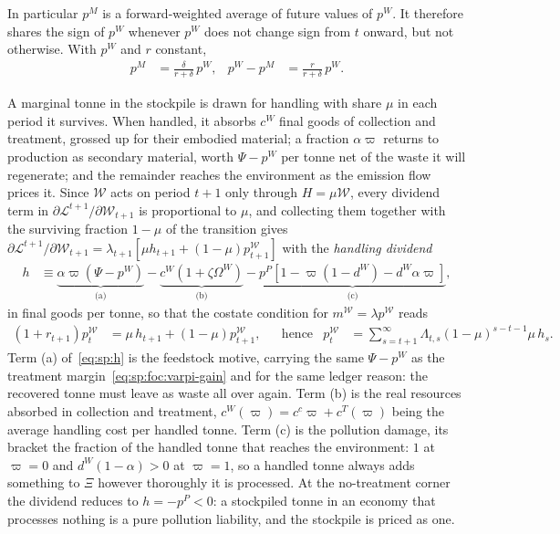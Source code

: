 In particular $p^M$ is a forward-weighted average of future values of $p^W$. It therefore shares the sign of $p^W$ whenever $p^W$ does not change sign from $t$ onward, but not otherwise. With $p^W$ and $r$ constant,
\begin{align}
p^M &= \frac{\delta}{r+\delta}\,p^W,
&
p^W-p^M &= \frac{r}{r+\delta}\,p^W .
\label{eq:sp:costate:M-steady}
\end{align}

 A marginal tonne in the stockpile is drawn for handling with share $\mu$ in each period it survives. When handled, it absorbs $c^W$ final goods of collection and treatment, grossed up for their embodied material; a fraction $\alpha\varpi$ returns to production as secondary material, worth $\Psi-p^W$ per tonne net of the waste it will regenerate; and the remainder reaches the environment as the emission flow prices it. Since $\mathcal W$ acts on period $t+1$ only through $H=\mu\mathcal W$, every dividend term in $\partial\mathcal L^{t+1}/\partial\mathcal W_{t+1}$ is proportional to $\mu$, and collecting them together with the surviving fraction $1-\mu$ of the transition gives $\partial\mathcal L^{t+1}/\partial\mathcal W_{t+1}=\lambda_{t+1}\left[\mu h_{t+1}+\left(1-\mu\right)p^{\mathcal W}_{t+1}\right]$ with the \emph{handling dividend}
\begin{align}
h &\equiv
\underbrace{\alpha\varpi\left(\Psi-p^W\right)}_{\text{(a)}}
-\underbrace{c^W\left(1+\zeta\Omega^W\right)}_{\text{(b)}}
-\underbrace{p^P\left[1-\varpi\left(1-d^W\right)-d^W\alpha\varpi\right]}_{\text{(c)}} ,
\label{eq:sp:h}
\end{align}
in final goods per tonne, so that the costate condition for $m^{\mathcal W}=\lambda p^{\mathcal W}$ reads
\begin{align}
\left(1+r_{t+1}\right)p^{\mathcal W}_t &= \mu\,h_{t+1}+\left(1-\mu\right)p^{\mathcal W}_{t+1},
&&\text{hence}
&
p^{\mathcal W}_t &= \sum_{s=t+1}^\infty \Lambda_{t,s}\left(1-\mu\right)^{s-t-1}\mu\,h_s .
\label{eq:sp:costate:Wstock}
\end{align}
Term (a) of~\eqref{eq:sp:h} is the feedstock motive, carrying the same $\Psi-p^W$ as the treatment margin~\eqref{eq:sp:foc:varpi-gain} and for the same ledger reason: the recovered tonne must leave as waste all over again. Term (b) is the real resources absorbed in collection and treatment, $c^W\left(\varpi\right)=c^c\varpi+c^T\left(\varpi\right)$ being the average handling cost per handled tonne. Term (c) is the pollution damage, its bracket the fraction of the handled tonne that reaches the environment: $1$ at $\varpi=0$ and $d^W\left(1-\alpha\right)>0$ at $\varpi=1$, so a handled tonne always adds something to $\Xi$ however thoroughly it is processed. At the no-treatment corner the dividend reduces to $h=-p^P<0$: a stockpiled tonne in an economy that processes nothing is a pure pollution liability, and the stockpile is priced as one.

